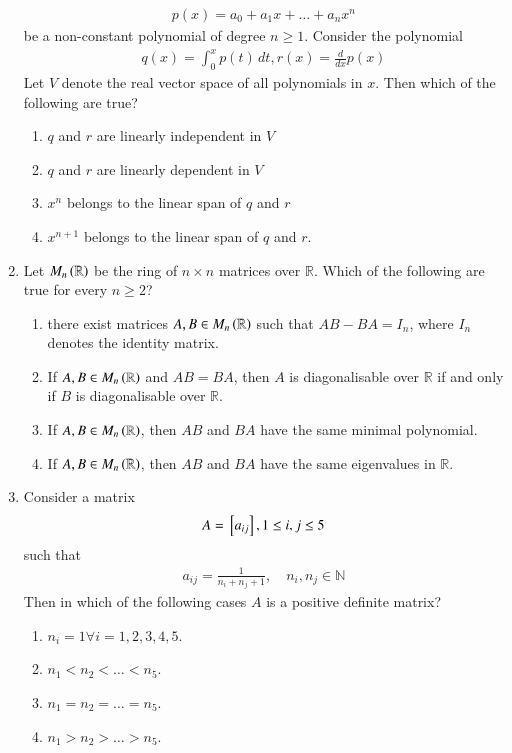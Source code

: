 \begin{enumerate}[label=\thesection.\arabic*.,ref=\thesection.\theenumi]
\begin{align}
p(x) = a_0 + a_1x + \dots + a_n x^n 
\end{align}
be a non-constant polynomial of degree $n \ge 1$.  Consider the polynomial
\begin{align}
q(x) = \int_{0}^{x}p(t)\, dt,
r(x) = \frac{d}{dx}p(x)
\end{align}
Let $V$ denote the real vector space of all polynomials in $x$.  Then which of the following are true?
\begin{enumerate}
\item $q$ and $r$ are linearly independent in $V$
\item $q$ and $r$ are linearly dependent in $V$
\item $x^n$ belongs to the linear span of $q$ and $r$
\item $x^{n+1}$ belongs to the linear span of $q$ and $r$.
\end{enumerate}
\item Let $M_n\left(\mathbb{R}\right)$ be the ring of $n \times n$ matrices over $\mathbb{R}$.  Which of the following are true for every $n \ge 2$?
\begin{enumerate}
\item there exist matrices $A,B \in M_n\left(\mathbb{R}\right)$ such that $AB- BA = I_n$, where $I_n$ denotes the identity matrix.
\item If $A,B \in M_n\left(\mathbb{R}\right)$ and $AB = BA$, then $A$ is diagonalisable over $\mathbb{R}$ if and only if $B$ is diagonalisable over $\mathbb{R}$.
\item If $A,B \in M_n\left(\mathbb{R}\right)$, then $AB$ and $BA$ have the same minimal polynomial.
\item If $A,B \in M_n\left(\mathbb{R}\right)$, then $AB$ and $BA$ have the same eigenvalues in $\mathbb{R}$.
\end{enumerate}
\item Consider a matrix 
\begin{align}
A = {}\left[a_{ij}\right], 1 \le i,j \le 5
\end{align}
such that
\begin{align}
a_{ij} = \frac{1}{n_i+n_j+1}, \quad n_i,n_j \in \mathbb{N}
\end{align}
Then in which of the following cases $A$ is a positive definite matrix?
\begin{enumerate}
\item $n_i = 1 \forall i = 1,2,3,4,5$.
\item $n_1 < n_2 < \dots < n_5$.
\item $n_1 = n_2 = \dots = n_5$.
\item $n_1 > n_2 > \dots > n_5$.

\end{enumerate}
\end{enumerate}
